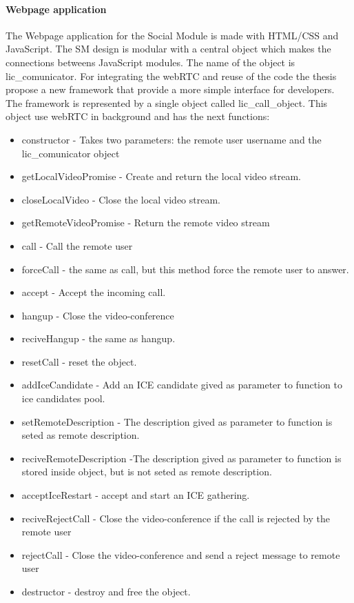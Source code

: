 \paragraph{Webpage application}
The Webpage application for the Social Module is made with HTML/CSS and JavaScript.
The SM design is modular with a central object which makes the connections betweens JavaScript modules.
The name of the object is lic_comunicator.
For integrating the webRTC and reuse of the code the thesis propose a new framework that provide
a more simple interface for developers. The framework is represented by a single object called lic_call_object.
This object use webRTC in background and has the next functions:
\begin{itemize}
    \item constructor - Takes two parameters: the remote user username and the lic_comunicator object
    \item getLocalVideoPromise - Create and return the local video stream.
    \item closeLocalVideo - Close the local video stream.
    \item getRemoteVideoPromise - Return the remote video stream
    \item call - Call the remote user
    \item forceCall - the same as call, but this method force the remote user to answer.
    \item accept - Accept the incoming call.
    \item hangup - Close the video-conference
    \item reciveHangup - the same as hangup.
    \item resetCall - reset the object.
    \item addIceCandidate - Add an ICE candidate gived as parameter to function to ice candidates pool.
    \item setRemoteDescription - The description gived as parameter to function is seted as remote description.
    \item reciveRemoteDescription -The description gived as parameter to function is stored inside object, but is not seted as remote description.
    \item acceptIceRestart - accept and start an ICE gathering.
    \item reciveRejectCall - Close the video-conference if the call is rejected by the remote user
    \item rejectCall - Close the video-conference and send a reject message to remote user
    \item destructor - destroy and free the object.
\end{itemize}
